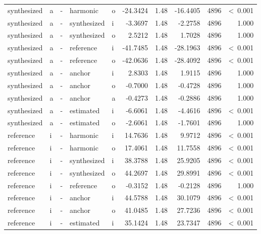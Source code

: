 \documentclass[a4paper,man,hidelinks,floatsintext]{apa7}
\begin{document}
\begin{table}[!htbp]
\begin{adjustbox}{max size={\columnwidth}{\textheight}}
\begin{tabular}{llrllrrrrr}
synthesized & a     & - & harmonic    & o     &   -24.3424 & 1.48 & -16.4405 & 4896 &  \textless~0.001 \\
synthesized & a     & - & synthesized & i     &    -3.3697 & 1.48 &  -2.2758 & 4896 &            1.000 \\
synthesized & a     & - & synthesized & o     &     2.5212 & 1.48 &   1.7028 & 4896 &            1.000 \\
synthesized & a     & - & reference   & i     &   -41.7485 & 1.48 & -28.1963 & 4896 &  \textless~0.001 \\
synthesized & a     & - & reference   & o     &   -42.0636 & 1.48 & -28.4092 & 4896 &  \textless~0.001 \\
synthesized & a     & - & anchor      & i     &     2.8303 & 1.48 &   1.9115 & 4896 &            1.000 \\
synthesized & a     & - & anchor      & o     &    -0.7000 & 1.48 &  -0.4728 & 4896 &            1.000 \\
synthesized & a     & - & anchor      & a     &    -0.4273 & 1.48 &  -0.2886 & 4896 &            1.000 \\
synthesized & a     & - & estimated   & i     &    -6.6061 & 1.48 &  -4.4616 & 4896 &  \textless~0.001 \\
synthesized & a     & - & estimated   & o     &    -2.6061 & 1.48 &  -1.7601 & 4896 &            1.000 \\
reference   & i     & - & harmonic    & i     &    14.7636 & 1.48 &   9.9712 & 4896 &  \textless~0.001 \\
reference   & i     & - & harmonic    & o     &    17.4061 & 1.48 &  11.7558 & 4896 &  \textless~0.001 \\
reference   & i     & - & synthesized & i     &    38.3788 & 1.48 &  25.9205 & 4896 &  \textless~0.001 \\
reference   & i     & - & synthesized & o     &    44.2697 & 1.48 &  29.8991 & 4896 &  \textless~0.001 \\
reference   & i     & - & reference   & o     &    -0.3152 & 1.48 &  -0.2128 & 4896 &            1.000 \\
reference   & i     & - & anchor      & i     &    44.5788 & 1.48 &  30.1079 & 4896 &  \textless~0.001 \\
reference   & i     & - & anchor      & o     &    41.0485 & 1.48 &  27.7236 & 4896 &  \textless~0.001 \\
reference   & i     & - & estimated   & i     &    35.1424 & 1.48 &  23.7347 & 4896 &  \textless~0.001 \\

\end{tabular}
\end{adjustbox}
\end{table}
\end{document}
